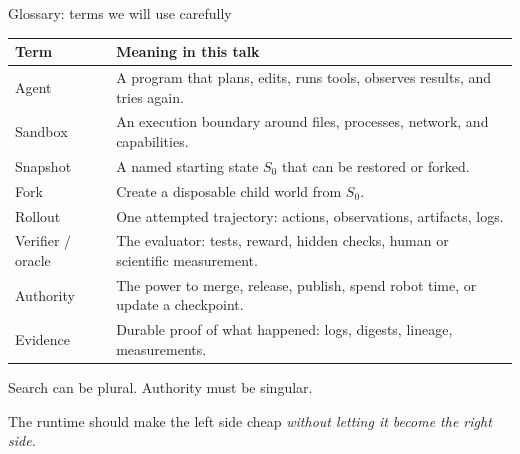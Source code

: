 \begin{frame}{Glossary: terms we will use carefully}
\small
\begin{tabular}{p{}p{}}
\toprule
\textbf{Term} & \textbf{Meaning in this talk} \\
\midrule
Agent & A program that plans, edits, runs tools, observes results, and tries again. \\
Sandbox & An execution boundary around files, processes, network, and capabilities. \\
Snapshot & A named starting state $S_0$ that can be restored or forked. \\
Fork & Create a disposable child world from $S_0$. \\
Rollout & One attempted trajectory: actions, observations, artifacts, logs. \\
Verifier / oracle & The evaluator: tests, reward, hidden checks, human or scientific measurement. \\
Authority & The power to merge, release, publish, spend robot time, or update a checkpoint. \\
Evidence & Durable proof of what happened: logs, digests, lineage, measurements. \\
\bottomrule
\end{tabular}
\end{frame}

\begin{frame}{Search can be plural. Authority must be singular.}
\centering
{}

\vspace{0.35em}
\Large The runtime should make the left side cheap \emph{without letting it become the right side.}
\end{frame}
